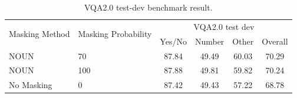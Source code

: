 \begin{table}[H]
    \centering
    \caption{VQA2.0 test-dev benchmark result.}
    \label{tab:vqa-prob}
    \begin{adjustbox}{width=0.8\textwidth}
        \begin{tabular}{ll|l|cccc}
            \hline
            \multicolumn{2}{c|}{\multirow{2}{*}{Masking Method}} & \multirow{2}{*}{Masking Probability} & \multicolumn{4}{c}{VQA2.0 test dev} \\
            & & & Yes/No & Number & Other & Overall \\
            \hline
            \multicolumn{2}{l|}{NOUN} & 70 & 87.84 & 49.49 & 60.03 & 70.29 \\
            \hline
            \multicolumn{2}{l|}{NOUN} & 100 & 87.88 & 49.81 & 59.82 & 70.24 \\
            \hline
            \multicolumn{2}{l|}{No Masking} & 0 & 87.42 & 49.43 & 57.22 & 68.78 \\
            \hline
        \end{tabular}
    \end{adjustbox}
\end{table}